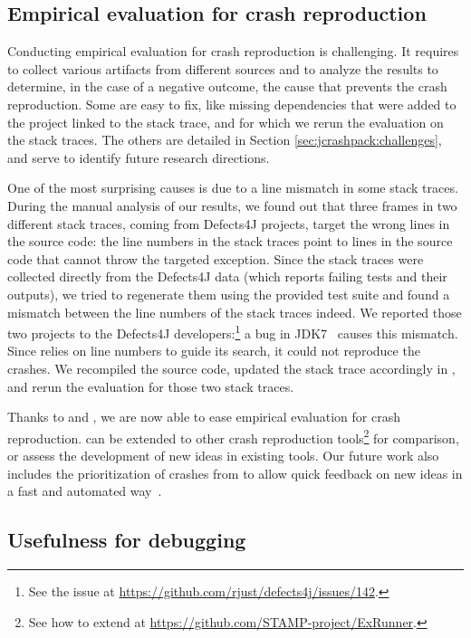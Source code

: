 
\subsection{Empirical evaluation for crash reproduction}

Conducting empirical evaluation for crash reproduction is challenging. It requires to collect various artifacts from different sources and to analyze the results to determine, in the case of a negative outcome, the cause that prevents the crash reproduction. Some are easy to fix, like missing dependencies that were added to the project linked to the stack trace, and for which we rerun the evaluation on the stack traces. The others are detailed in Section \ref{sec:jcrashpack:challenges}, and serve to identify future research directions. 

One of the most surprising causes is due to a line mismatch in some stack traces.
During the manual analysis of our results, we found out that three frames in two different stack traces, coming from Defects4J projects, target the wrong lines in the source code: the line numbers in the stack traces point to lines in the source code that cannot throw the targeted exception.
Since the stack traces were collected directly from the Defects4J data (which reports failing tests and their outputs), we tried to regenerate them using the provided test suite and found a mismatch between the line numbers of the stack traces indeed.
We reported those two projects to the Defects4J developers:\footnote{See the issue at \url{https://github.com/rjust/defects4j/issues/142}.} a bug in JDK7~\cite{JDK7024096} causes this mismatch.
Since \evocrash relies on line numbers to guide its search, it could not reproduce the crashes.
We recompiled the source code, updated the stack trace accordingly in \crashpack, and rerun the evaluation for those two stack traces.

Thanks to \crashpack and \exrunner, we are now able to ease empirical evaluation for crash reproduction. \exrunner can be extended to other crash reproduction tools\footnote{See how to extend \exrunner at \url{https://github.com/STAMP-project/ExRunner}.} for comparison, or assess the development of new ideas in existing tools. Our future work also includes the prioritization of crashes from \crashpack to allow quick feedback on new ideas in a fast and automated way~\cite{Alshahwan2018}.


\subsection{Usefulness for debugging}


